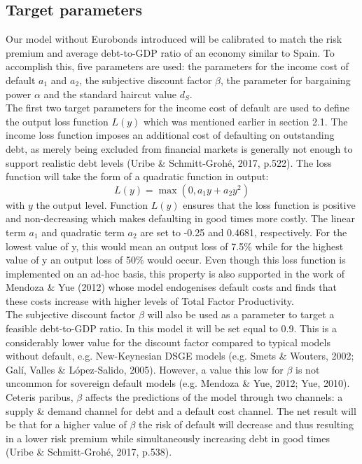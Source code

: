 \subsection{Target parameters}
Our model without Eurobonds introduced will be calibrated to match the risk premium and average debt-to-GDP ratio of an economy similar to Spain. To accomplish this, five parameters are used: the parameters for the income cost of default $a_1$ and $a_2$, the subjective discount factor $\beta$, the parameter for bargaining power $\alpha$ and the standard haircut value $d_S$.\\
\clearpage
The first two target parameters for the income cost of default are used to define the output loss function $L(y)$ which was mentioned earlier in section 2.1. The income loss function imposes an additional cost of defaulting on outstanding debt, as merely being excluded from financial markets is generally not enough to support realistic debt levels (Uribe \& Schmitt-Grohé, 2017, p.522). The loss function will take the form of a quadratic function in output:
\begin{equation*}
    L(y) = \max(0 , a_1y + a_2y^2)
\end{equation*}
with $y$ the output level. Function $L(y)$ ensures that the loss function is positive and non-decreasing which makes defaulting in good times more costly. The linear term $a_1$ and quadratic term $a_2$ are set to -0.25 and 0.4681, respectively. For the lowest value of y, this would mean an output loss of 
7.5\% while for the highest value of y an output loss of 50\% would occur. Even though this loss function is implemented on an ad-hoc basis, this property is also supported in the work of Mendoza \& Yue (2012) whose model endogenises default costs and finds that these costs increase with higher levels of Total Factor Productivity.\\

The subjective discount factor $\beta$ will also be used as a parameter to target a feasible debt-to-GDP ratio. In this model it will be set equal to 0.9. This is a considerably lower value for the discount factor compared to typical models without default, e.g. New-Keynesian DSGE models (e.g. Smets \& Wouters, 2002; Galí, Valles \& López-Salido, 2005). However, a value this low for $\beta$ is not uncommon for sovereign default models (e.g. Mendoza \& Yue, 2012; Yue, 2010). Ceteris paribus, $\beta$ affects the predictions of the model through two channels: a supply \& demand channel for debt and a default cost channel. The net result will be that for a higher value of $\beta$ the risk of default will decrease and thus resulting in a lower risk premium while simultaneously increasing debt in good times (Uribe \& Schmitt-Grohé, 2017, p.538).\\ 

